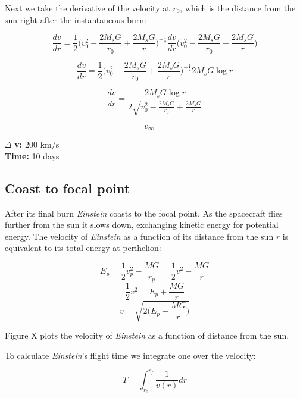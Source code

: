 \documentclass[12pt]{article} %
\begin{document}
Next we take the derivative of the velocity at $r_0$, which is the distance from the sun right after the instantaneous burn:

$$\frac{dv}{dr} = \frac{1}{2} \bigg(v_0^2-\frac{2M_sG}{r_0} + \frac{2M_sG}{r}\bigg)^{-\frac{1}{2}}\frac{dv}{dr}\bigg(v_0^2-\frac{2M_sG}{r_0} + \frac{2M_sG}{r}\bigg)$$

$$\frac{dv}{dr} = \frac{1}{2} \bigg(v_0^2-\frac{2M_sG}{r_0} + \frac{2M_sG}{r}\bigg)^{-\frac{1}{2}}2M_sG\log{r}$$

$$\frac{dv}{dr} = \frac{2M_sG \log{r}}{2 \sqrt{v_0^2-\frac{2M_sG}{r_0} + \frac{2M_sG}{r}}}$$

$$v_{\infty} = $$

$\Delta$ \textbf{v:} 200 km/s\\
\textbf{Time:} 10 days\\

\subsection{Coast to focal point}
After its final burn \textit{Einstein} coasts to the focal point. As the spacecraft flies further from the sun it slows down, exchanging kinetic energy for potential energy. The velocity of \textit{Einstein} as a function of its distance from the sun $r$ is equivalent to its total energy at perihelion:

$$E_{p} = \frac{1}{2}v_p^2 - \frac{MG}{r_p} = \frac{1}{2}v^2-\frac{MG}{r}$$
$$\frac{1}{2}v^2 = E_p+\frac{MG}{r}$$
$$v = \sqrt{2\big(E_p + \frac{MG}{r}\big)}$$

Figure X plots the velocity of \textit{Einstein} as a function of distance from the sun.

To calculate \textit{Einstein}'s flight time we integrate one over the velocity:

$$T = \int_{r_0}^{r_f} \frac{1}{v(r)} dr$$
\end{document}
